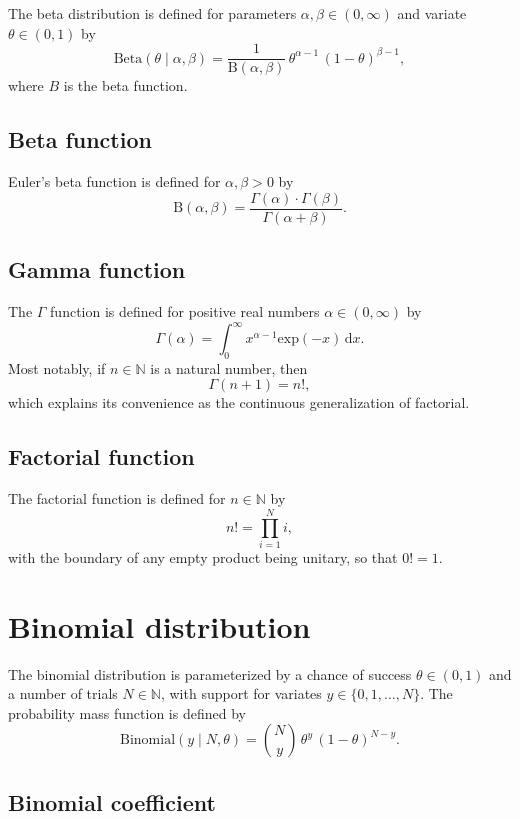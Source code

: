 \documentclass[11pt]{report}
\begin{document}
The beta distribution is defined for parameters $\alpha, \beta \in (0,
\infty)$ and variate $\theta \in (0, 1)$ by
\[
  \textrm{Beta}(\theta \mid \alpha, \beta)
  = \frac{1}{\textrm{B}(\alpha, \beta)}
  \, \theta^{\alpha - 1}
  \, (1 - \theta)^{\beta - 1},
\]
where $B$ is the beta function.

\subsection{Beta function}

Euler's beta function is defined for $\alpha, \beta > 0$ by
\[
  \textrm{B}(\alpha, \beta)
  = \frac{\Gamma(\alpha) \cdot \Gamma(\beta)}
         {\Gamma(\alpha + \beta)}.
\]

\subsection{Gamma function}

The $\Gamma$ function is defined for positive real numbers $\alpha \in
(0, \infty)$ by
\[
  \Gamma(\alpha) = \int_0^{\infty} x^{\alpha - 1} \textrm{exp}(-x) \, \textrm{d}x.
\]
Most notably, if $n \in \mathbb{N}$ is a natural number, then
\[
  \Gamma(n + 1) = n!,
\]
which explains its convenience as the continuous generalization of
factorial.

\subsection{Factorial function}

The factorial function is defined for $n \in \mathbb{N}$ by
\[
  n! = \prod_{i = 1}^N i,
\]
with the boundary of any empty product being unitary, so that $0! =
1$.

\section{Binomial distribution}

The binomial distribution is parameterized by a chance of success
$\theta \in (0, 1)$ and a number of trials $N \in \mathbb{N}$, with
support for variates $y \in \{0, 1, \ldots, N\}$.  The probability mass
function is defined by
\[
  \textrm{Binomial}(y \mid N, \theta)
  = \binom{N}{y} \, \theta^y \, (1 - \theta)^{N - y}.
\]

\subsection{Binomial coefficient}
\end{document}
